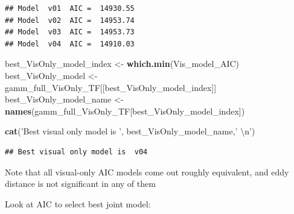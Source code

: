 \documentclass[11pt,]{article}
\newenvironment{Shaded}{\begin{snugshade}}{\end{snugshade}}
\newcommand{\KeywordTok}[1]{\textcolor[rgb]{0.13,0.29,0.53}{\textbf{{#1}}}}
\newcommand{\DecValTok}[1]{\textcolor[rgb]{0.00,0.00,0.81}{{#1}}}
\newcommand{\CharTok}[1]{\textcolor[rgb]{0.31,0.60,0.02}{{#1}}}
\newcommand{\StringTok}[1]{\textcolor[rgb]{0.31,0.60,0.02}{{#1}}}
\newcommand{\OtherTok}[1]{\textcolor[rgb]{0.56,0.35,0.01}{{#1}}}
\newcommand{\NormalTok}[1]{{#1}}
\begin{document}
\begin{Shaded}
\end{Shaded}

\begin{verbatim}
## Model  v01  AIC =  14930.55 
## Model  v02  AIC =  14953.74 
## Model  v03  AIC =  14953.73 
## Model  v04  AIC =  14910.03
\end{verbatim}

\begin{Shaded}
\begin{Highlighting}[]
\NormalTok{best_VisOnly_model_index <-}\StringTok{ }\KeywordTok{which.min}\NormalTok{(Vis_model_AIC)}
\NormalTok{best_VisOnly_model <-}\StringTok{ }\NormalTok{gamm_full_VisOnly_TF[[best_VisOnly_model_index]]}
\NormalTok{best_VisOnly_model_name <-}\StringTok{ }\KeywordTok{names}\NormalTok{(gamm_full_VisOnly_TF[best_VisOnly_model_index])}

\KeywordTok{cat}\NormalTok{(}\StringTok{'Best visual only model is '}\NormalTok{, best_VisOnly_model_name,}\StringTok{' }\CharTok{\textbackslash{}n}\StringTok{'}\NormalTok{)}
\end{Highlighting}
\end{Shaded}

\begin{verbatim}
## Best visual only model is  v04
\end{verbatim}

Note that all visual-only AIC models come out roughly equivalent, and
eddy distance is not significant in any of them

Look at AIC to select best joint model:

\begin{Shaded}
\end{Shaded}
\end{document}

